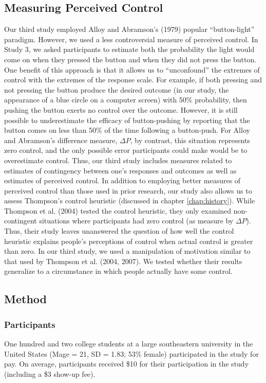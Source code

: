 \documentclass[USenglish,letterpaper,12pt,extrafontsizes,oneside,onecolumn,final]{memoir}
\newcommand{\deltap}{$\Delta P$}
\begin{document}
\subsection{Measuring Perceived Control}
Our third study employed Alloy and Abramson's (1979) popular ``button-light'' paradigm. However, we used a less controversial measure of perceived control. In Study 3, we asked participants to estimate both the probability the light would come on when they pressed the button and when they did not press the button. One benefit of this approach is that it allows us to ``unconfound'' the extremes of control with the extremes of the response scale. For example, if both pressing and not pressing the button produce the desired outcome (in our study, the appearance of a blue circle on a computer screen) with 50\% probability, then pushing the button exerts no control over the outcome. However, it is still possible to underestimate the efficacy of button-pushing by reporting that the button comes on less than 50\% of the time following a button-push. For Alloy and Abramson's difference measure, \deltap, by contrast, this situation represents zero control, and the only possible error participants could make would be to overestimate control. Thus, our third study includes measures related to estimates of contingency between one's responses and outcomes as well as estimates of perceived control.
In addition to employing better measures of perceived control than those used in prior research, our study also allows us to assess Thompson's control heuristic (discussed in chapter \ref{chap:history}). While Thompson et al. (2004) tested the control heuristic, they only examined non-contingent situations where participants had zero control (as measure by \deltap). Thus, their study leaves unanswered the question of how well the control heuristic explains people's perceptions of control when actual control is greater than zero. In our third study, we used a manipulation of motivation similar to that used by Thompson et al. (2004, 2007). We tested whether their results generalize to a circumstance in which people actually have some control.   

\subsection{Method}

\subsubsection{Participants}
One hundred and two college students at a large southeastern university in the United States (Mage = 21, SD = 1.83; 53\% female) participated in the study for pay. On average, participants received \$10 for their participation in the study (including a \$3 show-up fee). 
\end{document}
